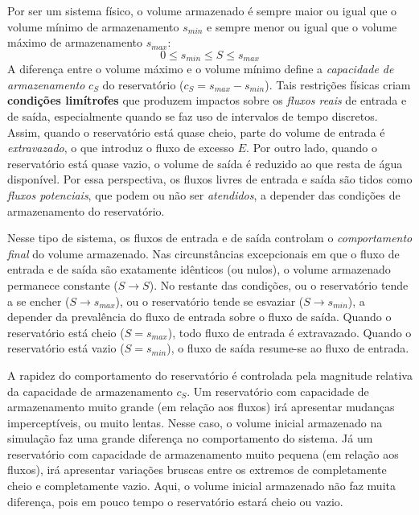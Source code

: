\documentclass[./main.tex]{subfiles}
\begin{document}
\par Por ser um sistema físico, o volume armazenado é sempre maior ou igual que o volume mínimo de armazenamento $s_{min}$ e sempre menor ou igual que o volume máximo de armazenamento $s_{max}$:
\[0 \le s_{min} \le S \le s_{max}\]
A diferença entre o volume máximo e o volume mínimo define a \textit{capacidade de armazenamento} $c_S$ do reservatório ($c_S = s_{max} -  s_{min}$). Tais restrições físicas criam \textbf{condições limítrofes} que produzem impactos sobre os \textit{fluxos reais} de entrada e de saída, especialmente quando se faz uso de intervalos de tempo discretos. Assim, quando o reservatório está quase cheio, parte do volume de entrada é \textit{extravazado}, o que introduz o fluxo de excesso $E$. Por outro lado, quando o reservatório está quase vazio, o volume de saída é reduzido ao que resta de água disponível. Por essa perspectiva, os fluxos livres de entrada e saída são tidos como \textit{fluxos potenciais}, que podem ou não ser \textit{atendidos}, a depender das condições de armazenamento do reservatório. 

\par Nesse tipo de sistema, os fluxos de entrada e de saída controlam o \textit{comportamento final} do volume armazenado. Nas circunstâncias excepcionais em que o fluxo de entrada e de saída são exatamente idênticos (ou nulos), o volume armazenado permanece constante ($S \to S$). No restante das condições, ou o reservatório tende a se encher ($S \to s_{max}$), ou o reservatório tende se esvaziar ($S \to s_{min}$), a depender da prevalência do fluxo de entrada sobre o fluxo de saída. Quando o reservatório está cheio ($S = s_{max}$), todo fluxo de entrada é extravazado. Quando o reservatório está vazio ($S = s_{min}$), o fluxo de saída resume-se ao fluxo de entrada. 

\par A rapidez do comportamento do reservatório é controlada pela magnitude relativa da capacidade de armazenamento $c_S$. Um reservatório com capacidade de armazenamento muito grande (em relação aos fluxos) irá apresentar mudanças imperceptíveis, ou muito lentas. Nesse caso, o volume inicial armazenado na simulação faz uma grande diferença no comportamento do sistema. Já um reservatório com capacidade de armazenamento muito pequena (em relação aos fluxos), irá apresentar variações bruscas entre os extremos de completamente cheio e completamente vazio. Aqui, o volume inicial armazenado não faz muita diferença, pois em pouco tempo o reservatório estará cheio ou vazio. 
\end{document}
